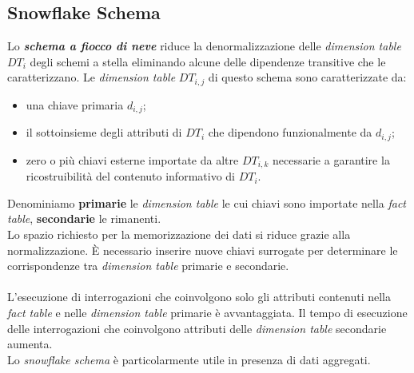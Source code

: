 \documentclass[a4paper, notitlepage, 9pt]{extreport}
\begin{document}
\subsection*{Snowflake Schema}
Lo \textit{\textbf{schema a fiocco di neve}} riduce la denormalizzazione delle \textit{dimension table} $DT_i$ degli schemi a stella eliminando alcune delle dipendenze transitive che le caratterizzano. Le \textit{dimension table} $DT_{i,j}$ di questo schema sono caratterizzate da:
\begin{itemize}
	\item una chiave primaria $d_{i,j}$;
	\item il sottoinsieme degli attributi di $DT_i$ che dipendono funzionalmente da $d_{i,j}$;
	\item zero o più chiavi esterne importate da altre $DT_{i,k}$ necessarie a garantire la ricostruibilità del contenuto informativo di $DT_i$.
\end{itemize}
Denominiamo \textbf{primarie} le \textit{dimension table} le cui chiavi sono importate nella \textit{fact table}, \textbf{secondarie} le rimanenti.\\
Lo spazio richiesto per la memorizzazione dei dati si riduce grazie alla normalizzazione. È necessario inserire nuove chiavi surrogate per determinare le corrispondenze tra \textit{dimension table} primarie e secondarie.\\\\
L’esecuzione di interrogazioni che coinvolgono solo gli attributi contenuti nella \textit{fact table} e nelle \textit{dimension table} primarie è avvantaggiata. Il tempo di esecuzione delle interrogazioni che coinvolgono attributi delle \textit{dimension table} secondarie aumenta.\\
Lo \textit{snowflake schema} è particolarmente utile in presenza di dati aggregati.
\end{document}
